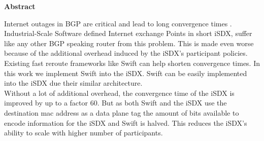 \clearpage
\null
\vfil %
\thispagestyle{plain}
\begin{center}\textbf{Abstract}\end{center}
Internet outages in BGP are critical and lead to long convergence times . \\
Industrial-Scale Software defined Internet exchange Points in short iSDX, suffer like any other BGP speaking router from this problem. This is made even worse because of the additional overhead induced by the iSDX's participant policies. Existing fast reroute frameworks like Swift can help shorten convergence times. In this work we implement Swift into the iSDX. Swift can be easily implemented into the iSDX due their similar architecture. \\
Without a lot of additional overhead, the convergence time of the iSDX is improved by up to a factor 60. But as both Swift and the iSDX use the destination mac address as a data plane tag the amount of bits available to encode information for the iSDX and Swift is halved. This reduces the iSDX's ability to scale with higher number of participants. 
\vfil
\clearpage 
